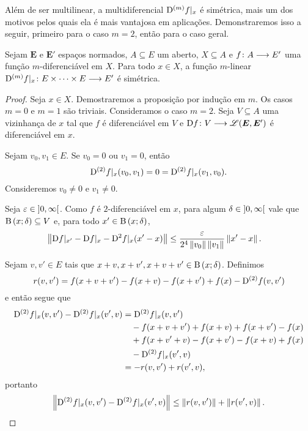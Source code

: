 Além de ser multilinear, a multidiferencial $\mathrm{D}^{(m)} f|_x$ é simétrica, mais um dos motivos pelos quais ela é mais vantajosa em aplicações. Demonstraremos isso a seguir, primeiro para o caso $m=2$, então para o caso geral.

\begin{proposition}
\label{prop:multidiferencial.simetrica}
Sejam $\bm E$ e $\bm E'$ espaços normados, $A \subseteq E$ um aberto, $X \subseteq A$ e $f\colon \allowbreak A \longrightarrow E'$ uma função $m$-diferenciável em $X$. Para todo $x \in X$, a função $m$-linear $\mathrm{D}^{(m)} f|_x\colon \allowbreak E \times \cdots \times E \longrightarrow E'$ é simétrica.
\end{proposition}
\begin{proof}
Seja $x \in X$. Demostraremos a proposição por indução em $m$. Os casos $m=0$ e $m=1$ são triviais. Consideramos o caso $m=2$. Seja $V \subseteq A$ uma vizinhança de $x$ tal que $f$ é diferenciável em $V$ e $\mathrm{D} f\colon \allowbreak V \longrightarrow \mathscr{L}(\bm E, \bm E')$ é diferenciável em $x$.

Sejam $v_0, v_1 \in E$. Se $v_0 = 0$ ou $v_1 = 0$, então
	\begin{equation*}
	\mathrm{D}^{(2)} f|_x(v_0,v_1) = 0 = \mathrm{D}^{(2)} f|_x(v_1,v_0).
	\end{equation*}
Consideremos $v_0 \neq 0$ e $v_1 \neq 0$.

Seja $\varepsilon \in \left]0,\allowbreak \infty\right[$. Como $f$ é $2$-diferenciável em $x$, para algum $\delta \in \left]0,\allowbreak \infty\right[$ vale que $\mathrm{B}\left(x; \delta\right) \subseteq V$ e, para todo $x' \in \mathrm{B}\left(x; \delta\right)$,
	\begin{align*}
	\left\Vert{\mathrm{D}f|_{x'} - \mathrm{D}f|_x - \mathrm{D}^2 f|_x (x'-x)}\right\Vert &\leq \frac{\varepsilon}{2^4\left\Vert{v_0}\right\Vert\left\Vert{v_1}\right\Vert} \left\Vert{x'-x}\right\Vert.
	\end{align*}

Sejam $v,v' \in E$ tais que $x+v, x+v', x+v+v' \in \mathrm{B}\left(x; \delta\right)$. Definimos
	\begin{equation*}
	r(v,v') = f(x+v+v') - f(x+v) - f(x+v') + f(x) - \mathrm{D}^{(2)} f(v,v')
	\end{equation*}
e então segue que
	\begin{align*}
	\mathrm{D}^{(2)} f|_x(v,v') - \mathrm{D}^{(2)} f|_x(v',v) &= \mathrm{D}^{(2)} f|_x(v,v') \\
		&\quad - f(x+v+v') + f(x+v) + f(x+v') - f(x) \\
		&\quad + f(x+v'+v) - f(x+v') - f(x+v) + f(x) \\
		&\quad - \mathrm{D}^{(2)} f|_x(v',v) \\
		&= -r(v,v') + r(v',v),
	\end{align*}
portanto
	\begin{equation*}
	\left\Vert{\mathrm{D}^{(2)} f|_x(v,v') - \mathrm{D}^{(2)} f|_x(v',v)}\right\Vert \leq \left\Vert{r(v,v')}\right\Vert + \left\Vert{r(v',v)}\right\Vert.
	\end{equation*}


\end{proof}
